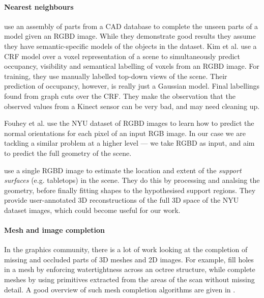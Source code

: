 \documentclass[10pt,a4paper, twocolumn]{article}
\makeatletter
\newcommand*{\eg}{e.g.\@\xspace}
\newcommand*{\ea}{et al.\@\xspace}
\makeatother
\begin{document}




\paragraph{Nearest neighbours}
\cite{shen-tog-2012} use an assembly of parts from a CAD database to complete the unseen parts of a model given an RGBD image. 
While they demonstrate good results they assume they have semantic-specific models of the objects in the dataset.
Kim \ea \cite{kim-iccv-2013} use a CRF model over a voxel representation of a scene to simultaneously predict occupancy, visibility and semantical labelling of voxels from an RGBD image. 
For training, they use manually labelled top-down views of the scene. 
Their prediction of occupancy, however, is really just a Gaussian model. 
Final labellings found from graph cuts over the CRF. 
They make the observation that the observed values from a Kinect sensor can be very bad, and may need cleaning up.

Fouhey \ea \cite{fouhey-iccv-2013} use the NYU dataset of RGBD images to learn how to predict the normal orientations for each pixel of an input RGB image. 
In our case we are tackling a similar problem at a higher level --- we take RGBD as input, and aim to predict the full geometry of the scene.

\cite{guo-iccv-2013} use a single RGBD image to estimate the location and extent of the \emph{support surfaces} (\eg tabletops) in the scene. They do this by processing and analsing the geometry, before finally fitting shapes to the hypothesised support regions. They provide user-annotated 3D reconstructions of the full 3D space of the NYU dataset images, which could become useful for our work.


\paragraph{Mesh and image completion}
In the graphics community, there is a lot of work looking at the completion of missing and occluded parts of 3D meshes and 2D images. 
For example, \cite{podolak-esgp-2005} fill holes in a mesh by enforcing watertightness across an octree structure, while \cite{schnabel-eurographics-2009} complete meshes by using primitives extracted from the areas of the scan without missing detail. 
A good overview of such mesh completion algorithms are given in \cite{ju-cst-2009}.
\end{document}
